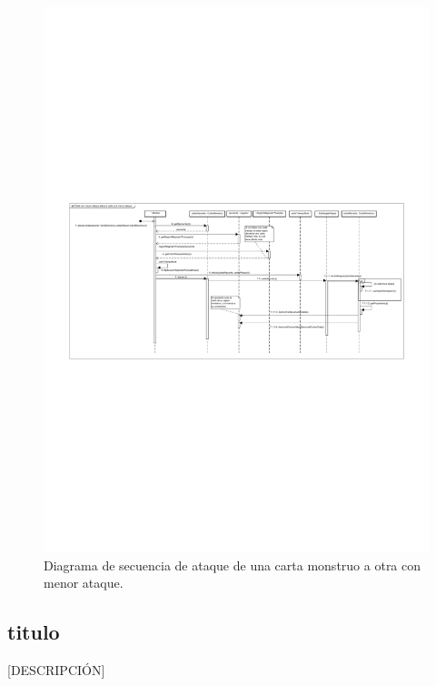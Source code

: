 \begin{figure}[H]
	\centering
	\includegraphics[scale=0.9]{includes/seq_Carta_con_mayor_ataque_ataca_a_carta_con_menor_ataque}
	\caption{Diagrama de secuencia de ataque de una carta monstruo a otra con menor ataque.}
	\label{seq_Carta_con_mayor_ataque_ataca_a_carta_con_menor_ataque}
\end{figure}

\subsection{titulo}

[DESCRIPCIÓN]

